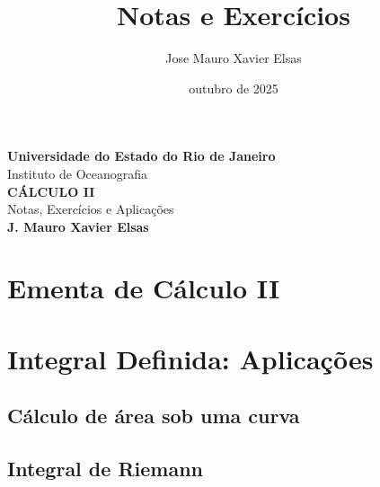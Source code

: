 \documentclass[a4paper,12pt,openany]{book}
\title{\textbf{Notas e Exercícios}}
\author{Jose Mauro Xavier Elsas}
\date{outubro de 2025}
\theoremstyle{definition}
\begin{document}
\begin{titlepage}
  \centering
  {\Large\textbf{Universidade do Estado do Rio de Janeiro}}\\[0.2cm]
  {\large Instituto de Oceanografia}\\[1.5cm]

  {\huge\bfseries CÁLCULO II}\\[0.2cm]
  {\Large Notas, Exercícios e Aplicações}\\[2cm]

  \vfill
  \textbf{J. Mauro Xavier Elsas}\\[0.3cm]
\end{titlepage}

\frontmatter
\tableofcontents

\mainmatter

\onehalfspacing
{}
\setlength{\parindent}{0pt}

\chapter*{Ementa de Cálculo II}


\chapter{Integral Definida: Aplicações}

\section{Cálculo de área sob uma curva}


\section{Integral de Riemann}\label{sec:integral-riemann}

\end{document}
